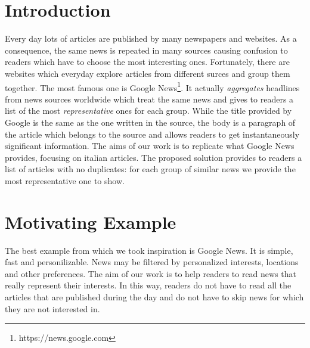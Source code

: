 \documentclass{acm_proc_article-sp}
\begin{document}
\maketitle
\section{Introduction}
\vspace{2mm}
Every day lots of articles are published by many newspapers and websites. As a consequence, the same news is repeated in many sources causing confusion to readers which have to choose the most interesting ones. Fortunately, there are websites which everyday explore articles from different surces and group them together. The most famous one is Google News\footnote{https://news.google.com}. It actually \textit{aggregates} headlines from news sources worldwide which treat the same news and gives to readers a list of the most \textit{representative} ones for each group. While the title provided by Google is the same as the one written in the source, the body is a paragraph of the article which belongs to the source and allows readers to get instantaneously significant information. The aims of our work is to replicate what Google News provides, focusing on italian articles. The proposed solution provides to readers a list of articles with no duplicates: for each group of similar news we provide the most representative one to show.

\section{Motivating Example}
\vspace{2mm}
The best example from which we took inspiration is Google News. It is simple, fast and personilizable. News may be filtered by personalized interests, locations and other preferences. The aim of our work is to help readers to read news that really represent their interests. In this way, readers do not have to read all the articles that are published during the day and do not have to skip news for which they are not interested in.

\end{document}
